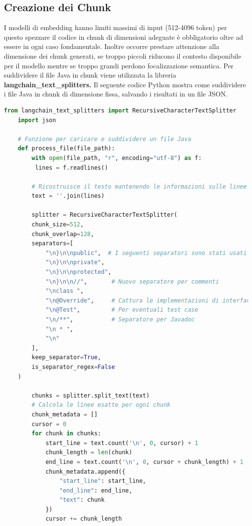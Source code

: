 \documentclass[12pt,a4paper,openright,twoside]{book}
\begin{document}
\subsection{Creazione dei Chunk}
I modelli di embedding hanno limiti massimi di input (512-4096 token)  per questo spezzare il codice in chunk di dimensioni adeguate è obbligatorio oltre ad essere in ogni caso fondamentale.
Inoltre occorre prestare attenzione alla dimensione dei chunk generati, se troppo piccoli riducono il contesto disponibile per il modello mentre se troppo grandi perdono focalizzazione semantica.
Per suddividere il file Java in chunk viene utilizzata la libreria \textbf{langchain\_text\_splitters.}
Il seguente codice Python mostra come suddividere i file Java in chunk di dimensione fissa, salvando i risultati in un file JSON.
\begin{lstlisting}[language=Python, caption={Codice Python per la suddivisione dei file Java in chunk}, label={lst:chunking}]
    from langchain_text_splitters import RecursiveCharacterTextSplitter
    import json
    
    # Funzione per caricare e suddividere un file Java
    def process_file(file_path):
        with open(file_path, "r", encoding="utf-8") as f:
         lines = f.readlines()
    
        # Ricostruisce il testo mantenendo le informazioni sulle linee
        text = ''.join(lines)
    
        splitter = RecursiveCharacterTextSplitter(
        chunk_size=512,
        chunk_overlap=128,
        separators=[
            "\n}\n\npublic",  # I seguenti separatori sono stati usati per provare a mantenere i metodi uniti
            "\n}\n\nprivate",
            "\n}\n\nprotected",
            "\n}\n\n//",       # Nuovo separatore per commenti
            "\nclass ",
            "\n@Override",     # Cattura le implementazioni di interfacce
            "\n@Test",         # Per eventuali test case
            "\n/**",           # Separatore per Javadoc
            "\n * ",
            "\n"
        ],
        keep_separator=True,
        is_separator_regex=False
    )
    
        chunks = splitter.split_text(text)
        # Calcola le linee esatte per ogni chunk
        chunk_metadata = []
        cursor = 0
        for chunk in chunks:
            start_line = text.count('\n', 0, cursor) + 1
            chunk_length = len(chunk)
            end_line = text.count('\n', 0, cursor + chunk_length) + 1
            chunk_metadata.append({
                "start_line": start_line,
                "end_line": end_line,
                "text": chunk
            })
            cursor += chunk_length
        

\end{lstlisting}
\end{document}
